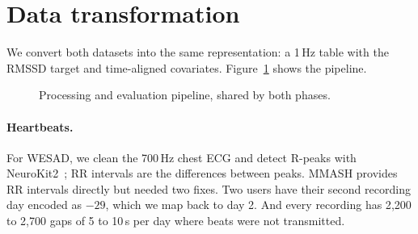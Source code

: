 \documentclass[11pt,a4paper]{article}
\begin{document}
\section{Data transformation}

We convert both datasets into the same representation: a 1\,Hz table with the RMSSD target and time-aligned covariates. Figure~\ref{fig:pipeline} shows the pipeline.

\begin{figure}[t]
  \centering
  \caption{Processing and evaluation pipeline, shared by both phases.}
  \label{fig:pipeline}
\end{figure}

\paragraph{Heartbeats.} For WESAD, we clean the 700\,Hz chest ECG and detect R-peaks with NeuroKit2~\cite{makowski2021neurokit2}; RR intervals are the differences between peaks. MMASH provides RR intervals directly but needed two fixes. Two users have their second recording day encoded as $-29$, which we map back to day 2. And every recording has 2{,}200 to 2{,}700 gaps of 5 to 10\,s per day where beats were not transmitted.
\end{document}
